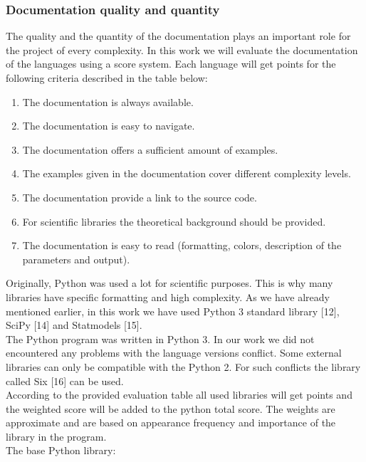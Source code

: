 \documentclass [twoside,
  11pt, a4paper,
  footinclude=true,
  headinclude=true,
  cleardoublepage=empty
]{article}
\begin{document}
\subsubsection{Documentation quality and quantity}
The quality and the quantity of the documentation plays an important role for the project of every complexity. In this work we will evaluate the documentation of the languages using a score system. Each language will get points for the following criteria described in the table below:
\begin{enumerate}
    \item The documentation is always available.
    \item The documentation is easy to navigate.
    \item The documentation offers a sufficient amount of examples.
    \item The examples given in the documentation cover different complexity levels.
    \item The documentation provide a link to the source code.
    \item For scientific libraries the theoretical background should be provided.
    \item The documentation is easy to read (formatting, colors, description of the parameters and output).
\end{enumerate}
Originally, Python was used a lot for scientific purposes. This is why many libraries have specific formatting and high complexity. As we have already mentioned earlier, in this work we have used Python 3 standard library [12],  SciPy [14] and Statmodels [15].\\
The Python program was written in Python 3. In our work we did not encountered any problems with the language versions conflict. Some external libraries can only be compatible with the Python 2. For such conflicts the library called Six [16] can be used.\\
According to the provided evaluation table all used libraries will get points and the weighted score will be added to the python total score. The weights are approximate and are based on appearance frequency and importance of the library in the program.\\
The base Python library:
\end{document}
